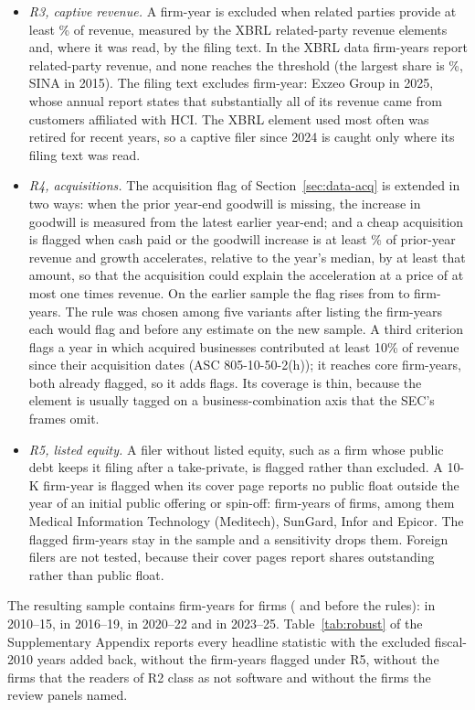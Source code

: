 \begin{itemize}
\item \emph{R3, captive revenue.} A firm-year is excluded when related parties provide at least \VCaptiveShare\% of revenue, measured by the XBRL related-party revenue elements and, where it was read, by the filing text. In the XBRL data \VRthreeXbrlN{} firm-years report related-party revenue, and none reaches the threshold (the largest share is \VRthreeMax\%, SINA in 2015). The filing text excludes \VRthree{} firm-year: Exzeo Group in 2025, whose annual report states that substantially all of its revenue came from customers affiliated with HCI. The XBRL element used most often was retired for recent years, so a captive filer since 2024 is caught only where its filing text was read.
\item \emph{R4, acquisitions.} The acquisition flag of Section~\ref{sec:data-acq} is extended in two ways: when the prior year-end goodwill is missing, the increase in goodwill is measured from the latest earlier year-end; and a cheap acquisition is flagged when cash paid or the goodwill increase is at least \VCheapShare\% of prior-year revenue and growth accelerates, relative to the year's median, by at least that amount, so that the acquisition could explain the acceleration at a price of at most one times revenue. On the earlier sample the flag rises from \VRfourOld{} to \VRfourNew{} firm-years. The rule was chosen among five variants after listing the firm-years each would flag and before any estimate on the new sample. A third criterion flags a year in which acquired businesses contributed at least 10\% of revenue since their acquisition dates (ASC 805-10-50-2(h)); it reaches \VRfourCN{} core firm-years, both already flagged, so it adds \VRfourCNew{} flags. Its coverage is thin, because the element is usually tagged on a business-combination axis that the SEC's frames omit.
\item \emph{R5, listed equity.} A filer without listed equity, such as a firm whose public debt keeps it filing after a take-private, is flagged rather than excluded. A 10-K firm-year is flagged when its cover page reports no public float outside the year of an initial public offering or spin-off: \VRfiveFlagN{} firm-years of \VRfiveFlagFirms{} firms, among them Medical Information Technology (Meditech), SunGard, Infor and Epicor. The flagged firm-years stay in the sample and a sensitivity drops them. Foreign filers are not tested, because their cover pages report shares outstanding rather than public float.
\end{itemize}
The resulting sample contains \VNEone{} firm-years for \VFirmsEone{} firms (\VNvTwo{} and \VFirmsvTwo{} before the rules): \VNPerTenFifteen{} in 2010--15, \VNPerSixteenNineteen{} in 2016--19, \VNPerTwentyTwentyTwo{} in 2020--22 and \VNPerTwentyThreeTwentyFive{} in 2023--25. Table~\ref{tab:robust} of the Supplementary Appendix reports every headline statistic with the excluded fiscal-2010 years added back, without the firm-years flagged under R5, without the firms that the readers of R2 class as not software and without the firms the review panels named.

